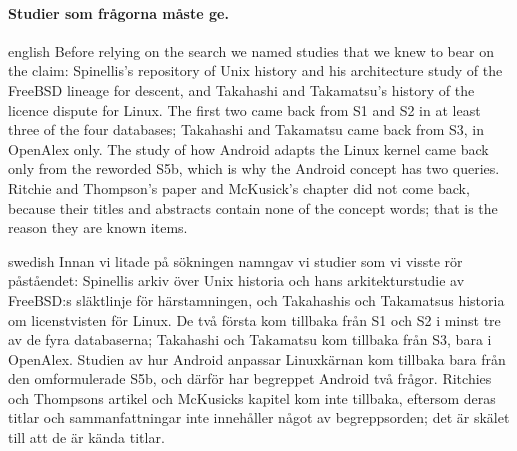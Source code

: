 \paragraph{%
  {Studier som frågorna måste ge.}} %
\begin{onlyin}{english} %
Before relying on the search we named studies that we knew to bear on the
claim: Spinellis's repository of Unix history\autocite{Spinellis2016Repository}
and his architecture study of the FreeBSD lineage%
\autocite{SpinellisAvgeriou2021} for descent, and Takahashi and
Takamatsu's history of the licence dispute\autocite{Takahashi2013Unix}
for Linux.
The first two came back from S1 and S2 in at least three of the four
databases; Takahashi and Takamatsu came back from S3, in OpenAlex only.
The study of how Android adapts the Linux kernel%
\autocite{Khomh2012Adapting} came back only from the reworded S5b, which
is why the Android concept has two queries.
Ritchie and Thompson's paper and McKusick's chapter did not come back,
because their titles and abstracts contain none of the concept words;
that is the reason they are known items.
\end{onlyin}
\begin{onlyin}{swedish}
Innan vi litade på sökningen namngav vi studier som vi visste rör
påståendet: Spinellis arkiv över Unix
historia\autocite{Spinellis2016Repository} och hans arkitekturstudie av
FreeBSD:s släktlinje\autocite{SpinellisAvgeriou2021} för härstamningen,
och Takahashis och Takamatsus historia om licenstvisten%
\autocite{Takahashi2013Unix} för Linux.
De två första kom tillbaka från S1 och S2 i minst tre av de fyra
databaserna; Takahashi och Takamatsu kom tillbaka från S3, bara i
OpenAlex.
Studien av hur Android anpassar Linuxkärnan%
\autocite{Khomh2012Adapting} kom tillbaka bara från den omformulerade
S5b, och därför har begreppet Android två frågor.
Ritchies och Thompsons artikel och McKusicks kapitel kom inte tillbaka,
eftersom deras titlar och sammanfattningar inte innehåller något av
begreppsorden; det är skälet till att de är kända titlar.
\end{onlyin}

